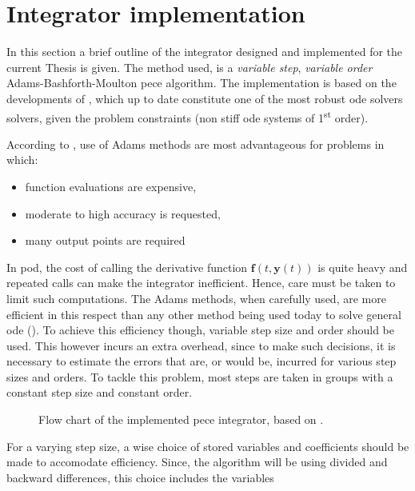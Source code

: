 \section{Integrator implementation}\label{sec:integrator-implementation}

In this section a brief outline of the integrator designed and implemented for 
the current Thesis is given. The method used, is a \emph{variable step}, 
\emph{variable order} Adams-Bashforth-Moulton \gls{pece} algorithm. The 
implementation is based on the developments of \cite{Shampine1975}, which up to 
date constitute one of the most robust \gls{ode} solvers solvers, given the 
problem constraints (non stiff \gls{ode} systems of 1\textsuperscript{st} order).

According to \cite{Shampine1975}, use of Adams methods are most advantageous for 
problems in which:
\begin{itemize}
    \item function evaluations are expensive,
    \item moderate to high accuracy is requested,
    \item many output points are required
\end{itemize}

In \gls{pod}, the cost of calling the derivative function $\bm{f}(t, \bm{y}(t))$ 
is quite heavy and repeated calls can make the integrator inefficient. Hence, care 
must be taken to limit such computations. The Adams methods, when carefully used, 
are more efficient in this respect than any other method being used today to 
solve general \gls{ode} (\cite{Shampine1975}). To achieve this efficiency though, 
variable step size and order should be used. This however incurs an extra overhead, 
since to make such decisions, it is necessary to estimate the errors that are, 
or would be, incurred for various step sizes and orders. To tackle this problem, 
most steps are taken in groups with a constant step size and constant order.

\begin{figure}
  \centering
  
  \caption{Flow chart of the implemented \gls{pece} integrator, based 
    on \cite{Shampine1975}.}
  \label{fig:sgode}
\end{figure}

For a varying step size, a wise choice of stored variables and coefficients 
should be made to accomodate efficiency. Since, the algorithm will be using divided 
and backward differences, this choice includes the variables

